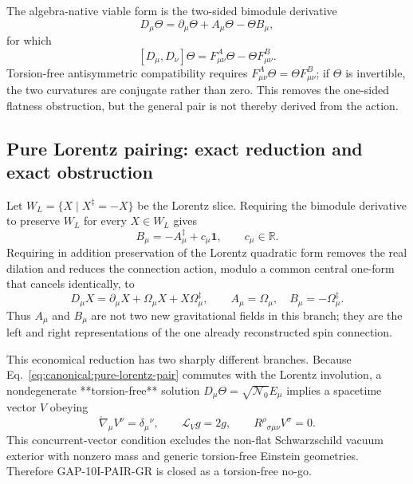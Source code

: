 The algebra-native viable form is the two-sided bimodule derivative
\begin{equation}
 \boxed{
 D_\mu\Theta=\partial_\mu\Theta+A_\mu\Theta-\Theta B_\mu,}
 \label{eq:canonical:two-sided-D}
\end{equation}
for which
\begin{equation}
 \boxed{
 [D_\mu,D_\nu]\Theta
 =F^A_{\mu\nu}\Theta-\Theta F^B_{\mu\nu}.}
 \label{eq:canonical:two-sided-curvature}
\end{equation}
Torsion-free antisymmetric compatibility requires
$F^A_{\mu\nu}\Theta=\Theta F^B_{\mu\nu}$; if $\Theta$ is invertible, the two
curvatures are conjugate rather than zero.  This removes the one-sided
flatness obstruction, but the general pair is not thereby derived from the
action.

\subsection{Pure Lorentz pairing: exact reduction and exact obstruction}
Let $W_L=\{X\mid X^\ddagger=-X\}$ be the Lorentz slice.  Requiring the
bimodule derivative to preserve $W_L$ for every $X\in W_L$ gives
\begin{equation}
 B_\mu=-A_\mu^\ddagger+c_\mu\mathbf1,
 \qquad c_\mu\in\mathbb R.
\end{equation}
Requiring in addition preservation of the Lorentz quadratic form removes the
real dilation and reduces the connection action, modulo a common central
one-form that cancels identically, to
\begin{equation}
 \boxed{D_\mu X=\partial_\mu X+\Omega_\mu X+X\Omega_\mu^\ddagger,}
 \qquad
 \boxed{A_\mu=\Omega_\mu,\quad B_\mu=-\Omega_\mu^\ddagger.}
 \label{eq:canonical:pure-lorentz-pair}
\end{equation}
Thus $A_\mu$ and $B_\mu$ are not two new gravitational fields in this branch;
they are the left and right representations of the one already reconstructed
spin connection.

This economical reduction has two sharply different branches.  Because
Eq.~\eqref{eq:canonical:pure-lorentz-pair} commutes with the Lorentz involution,
a nondegenerate **torsion-free** solution
$D_\mu\Theta=\sqrt{\mathcal N_0}E_\mu$ implies a spacetime vector $V$ obeying
\begin{equation}
 \boxed{\mathring\nabla_\mu V^\nu=\delta_\mu{}^\nu,}
 \qquad
 \mathcal L_Vg=2g,
 \qquad
 R^\rho{}_{\sigma\mu\nu}V^\sigma=0.
\end{equation}
This concurrent-vector condition excludes the non-flat Schwarzschild vacuum
exterior with nonzero mass and generic torsion-free Einstein geometries.
Therefore GAP-10I-PAIR-GR is closed as a torsion-free no-go.

